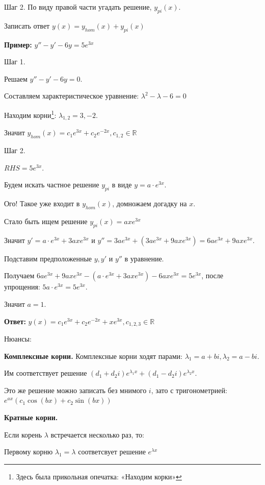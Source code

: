 \documentclass[10pt, a4paper]{article}
\begin{document}
\par Шаг 2. По виду правой части угадать решение, $y_{pi}(x).$
\par Записать ответ $y(x) = y_{hom}(x) + y_{pi}(x)$
\par \textbf{Пример:} $y'' - y' - 6y = 5e^{3x}$
\par Шаг 1.
\par Решаем $y'' - y' - 6y = 0$.
\par Составляем характеристическое уравнение: $\lambda^2 - \lambda - 6 = 0$
\par Находим корни\footnote{Здесь была прикольная опечатка: «Находим корки»}: $\lambda_{1,2} = 3, -2$.
\par Значит $y_{hom}(x) = c_1e^{3x} + c_2e^{-2x}, c_{1,2} \in \mathbb{R}$
\par Шаг 2.
\par $RHS = 5e^{3x}.$
\par Будем искать частное решение $y_{pi}$ в виде $y = a \cdot e^{3x}$.
\par Ого! Такое уже входит в $y_{hom}(x)$, домножаем догадку на $x$.
\par Стало быть ищем решение $y_{pi}(x) = axe^{3x}$
\par Значит $y' = a \cdot e^{3x} + 3axe^{3x}$ и $y'' = 3ae^{3x} + (3ae^{3x}+ 9axe^{3x}) = 6ae^{3x} + 9axe^{3x}$.
\par Подставим предположенные $y, y'$ и $y''$ в уравнение.
\par Получаем $6ae^{3x} + 9axe^{3x} - (a \cdot e^{3x} + 3axe^{3x}) - 6axe^{3x}  = 5e^{3x}$, после упрощения: $5a \cdot e^{3x} = 5e^{3x}$.
\par Значит $a = 1.$
\par \textbf{Ответ:} $y(x) = c_1e^{3x} + c_2e^{-2x} + xe^{3x}, c_{1, 2, 3} \in \mathbb{R}$ \\
\par Нюансы:
\par \textbf{Комплексные корни.} Комплексные корни ходят парами: $\lambda_1 = a+ bi, \lambda_2 = a - bi$.
\par Им соответствует решение $(d_1 + d_2i)e^{\lambda_1 x} + (d_1 - d_2i)e^{\lambda_2 x}$.
\par Это же решение можно записать без мнимого $i$, зато с тригонометрией: $e^{ax}(c_1\cos(bx) + c_2\sin(bx))$
\par \textbf{Кратные корни.}
\par Если корень $\lambda$ встречается несколько раз, то:
\par Первому корню $\lambda_1 = \lambda$ соответсвует решение $e^{\lambda x}$
\end{document}

